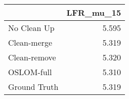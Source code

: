 \begin{tabular}{lr}
\toprule
{} & LFR_mu_15 \\
\midrule
No Clean Up  &     5.595 \\
Clean-merge  &     5.319 \\
Clean-remove &     5.320 \\
OSLOM-full   &     5.310 \\
Ground Truth &     5.319 \\
\bottomrule
\end{tabular}
